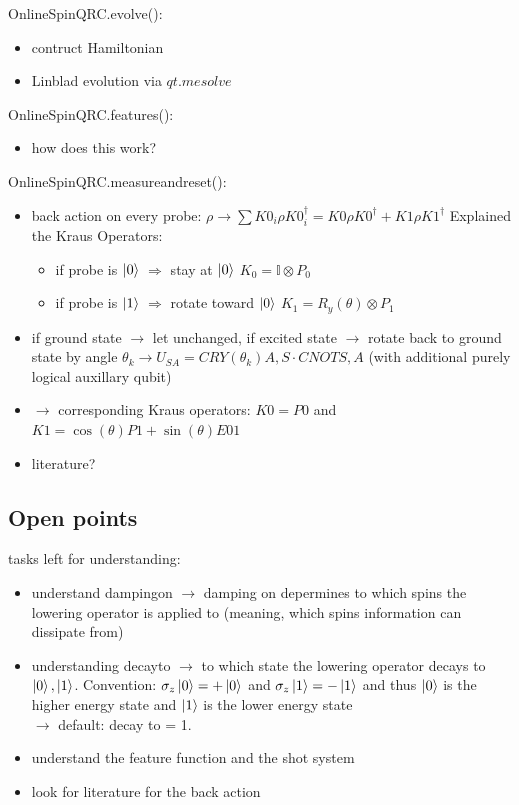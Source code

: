 OnlineSpinQRC.evolve():
\begin{itemize}
    \item contruct Hamiltonian
    \item Linblad evolution via $qt.mesolve$
\end{itemize}

OnlineSpinQRC.features():
\begin{itemize}
    \item how does this work?
\end{itemize}

OnlineSpinQRC.measureandreset():
\begin{itemize}
    \item back action on every probe: $\rho \to \sum K0_i \rho K0_i^\dagger = K0 \rho K0^\dagger + K1 \rho K1^\dagger$
    Explained the Kraus Operators:
    \begin{itemize}
        \item if probe is $\ket{0}$ $\Rightarrow$ stay at $\ket{0}$ \quad $K_0 = \mathbb{I} \otimes P_0$
        \item if probe is $\ket{1}$ $\Rightarrow$ rotate toward $\ket{0}$ \quad $K_1 = R_y(\theta) \otimes P_1$
    \end{itemize}
    \item if ground state $\to$ let unchanged, if excited state $\to$ rotate back to ground state by angle $\theta_k \to U_{SA} = CRY(\theta_k){A,S} \cdot CNOT{S,A}$ (with additional purely logical auxillary qubit)
    \item $\to$ corresponding Kraus operators: $K0 = P0$ and $K1 = \cos(\theta)P1 + \sin(\theta)E01$
    \item literature?
\end{itemize}

\subsection*{Open points}
tasks left for understanding:
\begin{itemize}
    \item understand dampingon $\to$ damping on depermines to which spins the lowering operator is applied to (meaning, which spins information can dissipate from)
    \item understanding decayto $\to$ to which state the lowering operator decays to $\ket{0}, \ket{1}$. Convention: $\sigma_z \ket{0} = +\ket{0}$ and $\sigma_z \ket{1} = -\ket{1}$ and thus $\ket{0}$ is the higher energy state and $\ket{1}$ is the lower energy state \\$\to$ default: decay to = 1.    \item understand the feature function and the shot system
    \item look for literature for the back action
\end{itemize}


